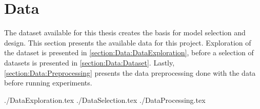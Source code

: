 \chapter{Data}
\label{section:Data}




The dataset available for this thesis creates the basis for model selection and design.
This section presents the available data for this project.
Exploration of the dataset is presented in \cref{section:Data:DataExploration},
before a selection of datasets is presented in \cref{section:Data:Dataset}.
Lastly, \cref{section:Data:Preprocessing} presents the data preprocessing done with the data before running experiments.

{./DataExploration.tex}
{./DataSelection.tex}
{./DataProcessing.tex}
